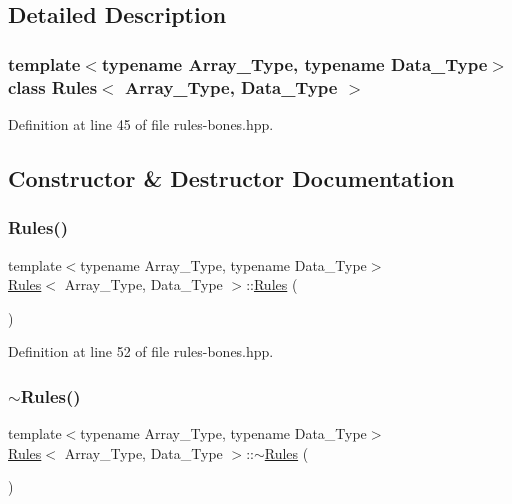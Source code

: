 \subsection{Detailed Description}
\subsubsection*{template$<$typename Array\+\_\+\+Type, typename Data\+\_\+\+Type$>$\newline
class Rules$<$ Array\+\_\+\+Type, Data\+\_\+\+Type $>$}



Definition at line 45 of file rules-\/bones.\+hpp.



\subsection{Constructor \& Destructor Documentation}
\mbox{\label{class_rules_aa78e9abf82ed8a0e4320d570191c8968}} 
\subsubsection{\texorpdfstring{Rules()}{Rules()}}
{\footnotesize\ttfamily template$<$typename Array\+\_\+\+Type, typename Data\+\_\+\+Type$>$ \\
\hyperlink{class_rules}{Rules}$<$ Array\+\_\+\+Type, Data\+\_\+\+Type $>$\+::\hyperlink{class_rules}{Rules} (\begin{DoxyParamCaption}{ }\end{DoxyParamCaption})\hspace{0.3cm}{\ttfamily [inline]}}



Definition at line 52 of file rules-\/bones.\+hpp.

\mbox{\label{class_rules_aa76d96c2316bc4a2a26bf4ec7b8d9463}} 
\subsubsection{\texorpdfstring{$\sim$\+Rules()}{~Rules()}}
{\footnotesize\ttfamily template$<$typename Array\+\_\+\+Type, typename Data\+\_\+\+Type$>$ \\
\hyperlink{class_rules}{Rules}$<$ Array\+\_\+\+Type, Data\+\_\+\+Type $>$\+::$\sim$\hyperlink{class_rules}{Rules} (\begin{DoxyParamCaption}{ }\end{DoxyParamCaption})\hspace{0.3cm}{\ttfamily [inline]}}



